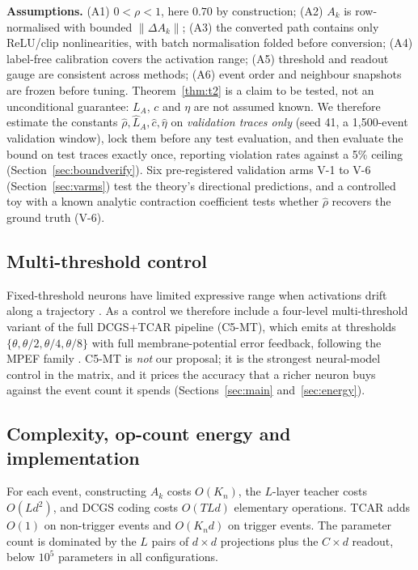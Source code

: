 \documentclass[preprint,12pt]{elsarticle}
\begin{document}
\textbf{Assumptions.} (A1) $0<\rho<1$, here $0.70$ by construction; (A2) $A_k$ is row-normalised with bounded $\|\Delta A_k\|$; (A3) the converted path contains only ReLU/clip nonlinearities, with batch normalisation folded before conversion; (A4) label-free calibration covers the activation range; (A5) threshold and readout gauge are consistent across methods; (A6) event order and neighbour snapshots are frozen before tuning. Theorem~\ref{thm:t2} is a claim to be tested, not an unconditional guarantee: $L_A$, $c$ and $\eta$ are not assumed known. We therefore estimate the constants $\hat\rho,\hat L_A,\hat c,\hat\eta$ on \emph{validation traces only} (seed 41, a 1{,}500-event validation window), lock them before any test evaluation, and then evaluate the bound on test traces exactly once, reporting violation rates against a 5\% ceiling (Section~\ref{sec:boundverify}). Six pre-registered validation arms V-1 to V-6 (Section~\ref{sec:varms}) test the theory's directional predictions, and a controlled toy with a known analytic contraction coefficient tests whether $\hat\rho$ recovers the ground truth (V-6).

\subsection{Multi-threshold control}
\label{sec:c5mt}

Fixed-threshold neurons have limited expressive range when activations drift along a trajectory \cite{fang2026mpef}. As a control we therefore include a four-level multi-threshold variant of the full DCGS+TCAR pipeline (C5-MT), which emits at thresholds $\{\theta,\theta/2,\theta/4,\theta/8\}$ with full membrane-potential error feedback, following the MPEF family \cite{fang2026mpef}. C5-MT is \emph{not} our proposal; it is the strongest neural-model control in the matrix, and it prices the accuracy that a richer neuron buys against the event count it spends (Sections~\ref{sec:main} and~\ref{sec:energy}).

\subsection{Complexity, op-count energy and implementation}
\label{sec:complexity}

For each event, constructing $A_k$ costs $O(K_n)$, the $L$-layer teacher costs $O(Ld^2)$, and DCGS coding costs $O(TLd)$ elementary operations. TCAR adds $O(1)$ on non-trigger events and $O(K_n d)$ on trigger events. The parameter count is dominated by the $L$ pairs of $d\times d$ projections plus the $C\times d$ readout, below $10^5$ parameters in all configurations.
\end{document}
